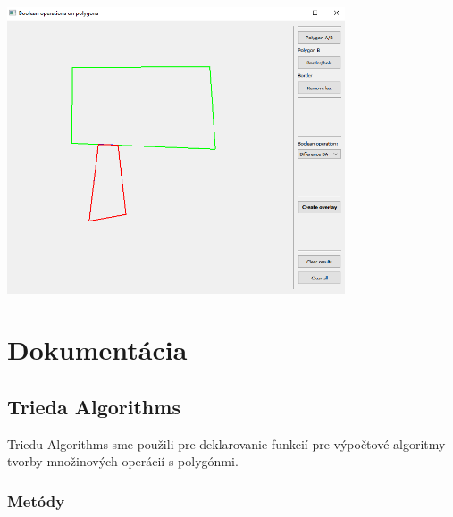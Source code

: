 \documentclass[12pt]{article}
\begin{document}
\begin{center}
	\includegraphics[width=10cm]{./img/singular_edge_diffBA.png}
\end{center}


\section{Dokumentácia}
\subsection{Trieda Algorithms}
Triedu Algorithms sme použili pre deklarovanie funkcií pre výpočtové algoritmy tvorby množinových operácií s polygónmi.

\subsubsection{Metódy}
\end{document}
